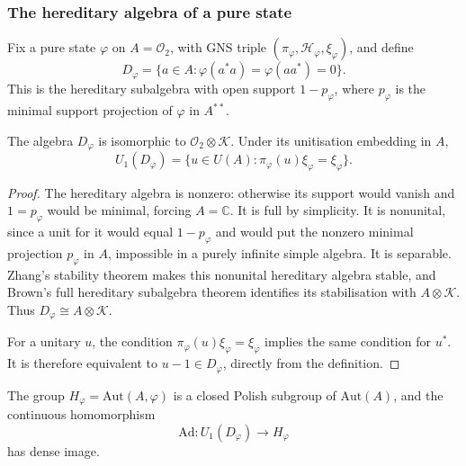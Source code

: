 \subsubsection{The hereditary algebra of a pure state}

Fix a pure state $\varphi$ on $A=\mathcal{O}_2$, with GNS triple $(\pi_\varphi,\mathcal{H}_\varphi,\xi_\varphi)$, and define 
\begin{equation*}
D_\varphi=\{a\in A: \varphi(a^*a)=\varphi(aa^*)=0\}.
\end{equation*}
This is the hereditary subalgebra with open support $1-p_\varphi$, where $p_\varphi$ is the minimal support projection of $\varphi$ in $A^{**}$.

\begin{lemma}\label{lem:cu-hereditary}
 The algebra $D_\varphi$ is isomorphic to $\mathcal{O}_2\otimes\mathcal{K}$. Under its unitisation embedding in $A$, 
\begin{equation*}
U_1(D_\varphi) =\{u\in U(A):\pi_\varphi(u)\xi_\varphi=\xi_\varphi\}.
\end{equation*}
\end{lemma}

\begin{proof}
The hereditary algebra is nonzero: otherwise its support would vanish and $1=p_\varphi$ would be minimal, forcing $A=\mathbb{C}$. It is full by
simplicity. It is nonunital, since a unit for it would equal $1-p_\varphi$
and would put the nonzero minimal projection $p_\varphi$ in $A$, impossible
in a purely infinite simple algebra. It is separable. Zhang's stability
theorem \cite[Theorem 1.2(i)]{Zhang1992} makes this nonunital hereditary algebra
stable, and Brown's full hereditary subalgebra theorem \cite[Theorem 2.8]{Brown1977} identifies its stabilisation with $A\otimes\mathcal{K}$. Thus $D_\varphi\cong A\otimes\mathcal{K}$.

For a unitary $u$, the condition $\pi_\varphi(u)\xi_\varphi =\xi_\varphi$
implies the same condition for $u^*$. It is therefore equivalent to $u-1\in
D_\varphi$, directly from the definition.
\end{proof}

\begin{proposition}\label{prop:cu-stabilizer-density}
 The group $H_\varphi=\mathrm{Aut}(A,\varphi)$
is a closed Polish subgroup of $\mathrm{Aut}(A)$, and the continuous
homomorphism 
\begin{equation*}
\mathrm{Ad}:U_1(D_\varphi)\longrightarrow H_\varphi
\end{equation*}
has dense image.
\end{proposition}

